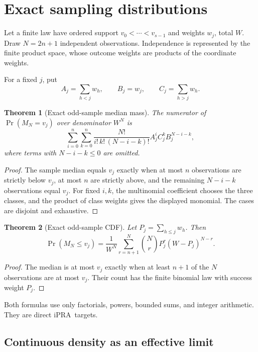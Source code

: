 \documentclass[11pt]{article}
\newtheorem{theorem}{Theorem}[section]
\newcommand{\iPRA}{\ensuremath{\mathrm{iPRA}}}
\begin{document}
\section{Exact sampling distributions}

Let a finite law have ordered support $v_0<\cdots<v_{s-1}$ and weights
$w_j$, total $W$.  Draw $N=2n+1$ independent observations.  Independence is
represented by the finite product space, whose outcome weights are products
of the coordinate weights.

For a fixed $j$, put
\[
 A_j=\sum_{h<j}w_h,\qquad B_j=w_j,\qquad C_j=\sum_{h>j}w_h.
\]

\begin{theorem}[Exact odd-sample median mass]\label{thm:sample-pmf}
The numerator of $\Pr(M_N=v_j)$ over denominator $W^N$ is
\begin{equation}\label{eq:sample-pmf}
 \sum_{i=0}^{n}\sum_{k=0}^{n}
 \frac{N!}{i!\,k!\,(N-i-k)!}
 A_j^i C_j^k B_j^{N-i-k},
\end{equation}
where terms with $N-i-k\leq0$ are omitted.
\end{theorem}

\begin{proof}
The sample median equals $v_j$ exactly when at most $n$ observations are
strictly below $v_j$, at most $n$ are strictly above, and the remaining
$N-i-k$ observations equal $v_j$.  For fixed $i,k$, the multinomial
coefficient chooses the three classes, and the product of class weights gives
the displayed monomial.  The cases are disjoint and exhaustive.
\end{proof}

\begin{theorem}[Exact odd-sample CDF]\label{thm:sample-cdf}
Let $P_j=\sum_{h\leq j}w_h$.  Then
\begin{equation}\label{eq:sample-cdf}
 \Pr(M_N\leq v_j)
 =\frac1{W^N}\sum_{r=n+1}^{N}\binom Nr P_j^r(W-P_j)^{N-r}.
\end{equation}
\end{theorem}

\begin{proof}
The median is at most $v_j$ exactly when at least $n+1$ of the $N$
observations are at most $v_j$.  Their count has the finite binomial law with
success weight $P_j$.
\end{proof}

Both formulas use only factorials, powers, bounded sums, and integer
arithmetic.  They are direct \iPRA\ targets.

\subsection{Continuous density as an effective limit}
\end{document}
